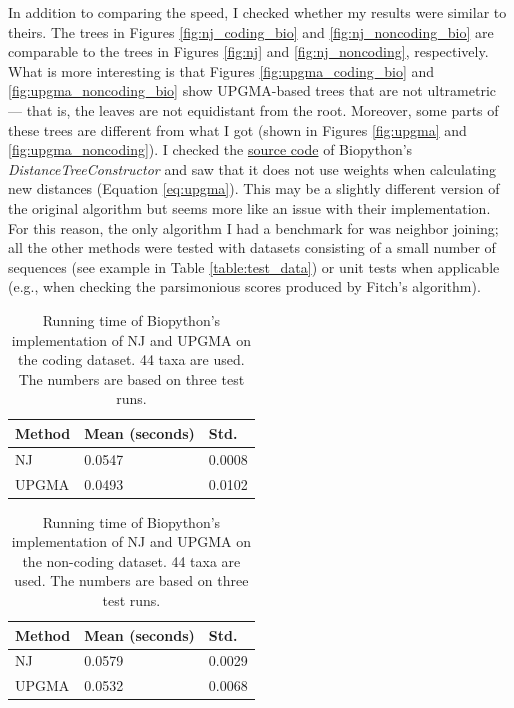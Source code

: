 \documentclass[11pt,twocolumn]{article}
\begin{document}
In addition to comparing the speed, I checked whether my results were similar to theirs. The trees in Figures \ref{fig:nj_coding_bio} and \ref{fig:nj_noncoding_bio} are comparable to the trees in Figures \ref{fig:nj} and \ref{fig:nj_noncoding}, respectively. What is more interesting is that Figures \ref{fig:upgma_coding_bio} and \ref{fig:upgma_noncoding_bio} show UPGMA-based trees that are not ultrametric — that is, the leaves are not equidistant from the root. Moreover, some parts of these trees are different from what I got (shown in Figures \ref{fig:upgma} and \ref{fig:upgma_noncoding}). I checked the \href{https://github.com/biopython/biopython}{source code} of Biopython's \textit{DistanceTreeConstructor} and saw that it does not use weights when calculating new distances (Equation \ref{eq:upgma}). This may be a slightly different version of the original algorithm but seems more like an issue with their implementation. For this reason, the only algorithm I had a benchmark for was neighbor joining; all the other methods were tested with datasets consisting of a small number of sequences (see example in Table \ref{table:test_data}) or unit tests when applicable (e.g., when checking the parsimonious scores produced by Fitch's algorithm).

\begin{minipage}[b]{.475\textwidth}
	\begin{table}[H]
	\caption{Running time of Biopython's implementation of NJ and UPGMA on the coding dataset. 44 taxa are used. The numbers are based on three test runs.}
	\centering
	\begin{tabular}{lll}
		\toprule
		Method & Mean (seconds) & Std. \\
		\midrule
		NJ & 0.0547 & 0.0008 \\
		UPGMA & 0.0493 & 0.0102 \\	
		\bottomrule
	\end{tabular}
	\label{table:distance_biopython}
\end{table}
\end{minipage}%
\hfill
\begin{minipage}[b]{0.475\textwidth}
\begin{table}[H]
	\caption{Running time of Biopython's implementation of NJ and UPGMA on the non-coding dataset. 44 taxa are used. The numbers are based on three test runs.}
	\centering
	\begin{tabular}{lll}
		\toprule
		Method & Mean (seconds) & Std. \\
		\midrule
		NJ & 0.0579 & 0.0029 \\
		UPGMA & 0.0532 & 0.0068 \\	
		\bottomrule
	\end{tabular}
	\label{table:distance_biopython_2}
\end{table}
\end{minipage}
\end{document}
